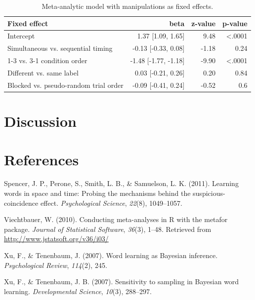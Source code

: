 \documentclass[english,floatsintext,man]{apa6}
\theoremstyle{definition}
\theoremstyle{definition}
\theoremstyle{remark}
\begin{document}
\begin{table}

\caption{\label{tab:unnamed-chunk-6}Meta-analytic model with manipulations as fixed effects.}
\centering
\fontsize{12}{14}\selectfont
\begin{tabular}[t]{lrrr}
\toprule
Fixed effect & beta & z-value & p-value\\
\midrule
Intercept & 1.37 [1.09, 1.65] & 9.48 & <.0001\\
Simultaneous vs. sequential timing & -0.13 [-0.33, 0.08] & -1.18 & 0.24\\
1-3 vs. 3-1 condition order & -1.48 [-1.77, -1.18] & -9.90 & <.0001\\
Different vs. same label & 0.03 [-0.21, 0.26] & 0.20 & 0.84\\
Blocked vs. pseudo-random trial order & -0.09 [-0.41, 0.24] & -0.52 & 0.6\\
\bottomrule
\end{tabular}
\end{table}

\section{Discussion}\label{discussion}

\newpage

\section{References}\label{references}

\setlength{\parindent}{-0.5in} \setlength{\leftskip}{0.5in}

\hypertarget{refs}{}
\hypertarget{ref-spencer2011learning}{}
Spencer, J. P., Perone, S., Smith, L. B., \& Samuelson, L. K. (2011).
Learning words in space and time: Probing the mechanisms behind the
suspicious-coincidence effect. \emph{Psychological Science},
\emph{22}(8), 1049--1057.

\hypertarget{ref-R-metafor}{}
Viechtbauer, W. (2010). Conducting meta-analyses in R with the metafor
package. \emph{Journal of Statistical Software}, \emph{36}(3), 1--48.
Retrieved from \url{http://www.jstatsoft.org/v36/i03/}

\hypertarget{ref-xu2007word}{}
Xu, F., \& Tenenbaum, J. (2007). Word learning as Bayesian inference.
\emph{Psychological Review}, \emph{114}(2), 245.

\hypertarget{ref-xu2007}{}
Xu, F., \& Tenenbaum, J. B. (2007). Sensitivity to sampling in Bayesian
word learning. \emph{Developmental Science}, \emph{10}(3), 288--297.
\end{document}
